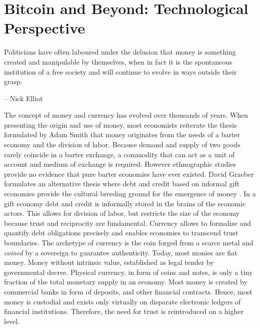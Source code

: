 \chapter{Bitcoin and Beyond: Technological Perspective}
\label{sec:crypto}

\epigraph{Politicians have often laboured under the delusion that money is something created and manipulable by themselves, when in fact it is the spontaneous institution of a free society and will continue to evolve in ways outside their grasp.}{-- \textup{Nick Elliot}}

The concept of money and currency has evolved over thousands of years. When presenting the origin and use of money, most economists reiterate the thesis formulated by Adam Smith that money originates from the needs of a barter economy and the division of labor. Because demand and supply of two goods rarely coincide in a barter exchange, a commodity that can act as a unit of account and medium of exchange is required. However ethnographic studies provide no evidence that pure barter economies have ever existed. David Graeber formulates an alternative thesis where debt and credit based on informal gift economies provide the cultural breeding ground for the emergence of money \parencite{graeber2014debt}. 
In a gift economy debt and credit is informally stored in the brains of the economic actors. This allows for division of labor, but restricts the size of the economy because trust and reciprocity are fundamental. Currency allows to formalize and quantify debt obligations precisely and enables economies to transcend trust boundaries. The archetype of currency is the coin forged from a scarce metal and \emph{coined} by a sovereign to guarantee authenticity. Today, most monies are fiat money. Money without intrinsic value, established as legal tender by governmental decree. Physical currency, in form of coins and notes, is only a tiny fraction of the total monetary supply in an economy. Most money is created by commercial banks in form of deposits, and other financial contracts. Hence, most money is custodial and exists only virtually on disparate electronic ledgers of financial institutions. Therefore, the need for trust is reintroduced on a higher level.

